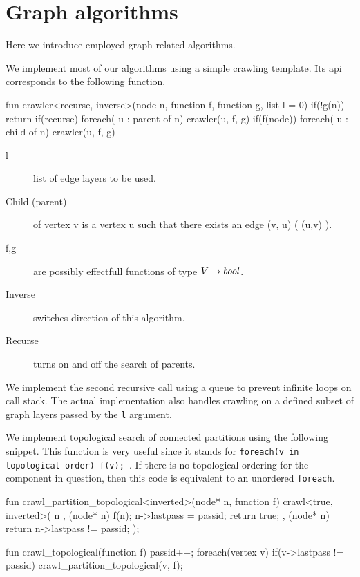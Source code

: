 \section{Graph algorithms}

Here we introduce employed graph-related algorithms. 

We implement most of our algorithms using a simple crawling template. Its api corresponds to the following function.

\begin{code}
fun crawler<recurse, inverse>(node n, function f, function g, list l = {0})
{
  if(!g(n))
    return
  if(recurse)
    foreach( u : parent of n)
      crawler(u, f, g)
  if(f(node))
    foreach( u : child of n)
      crawler(u, f, g)
}
\end{code}

\begin{description}
  \item [l] list of edge layers to be used.
  \item [Child (parent)] of vertex v is a vertex u such that there exists an edge (v, u) ( (u,v) ).
  \item [f,g] are possibly effectfull functions of type $V \rightarrow bool$.
  \item [Inverse] switches direction of this algorithm.
  \item [Recurse] turns on and off the search of parents.
\end{description}

We implement the second recursive call using a queue to prevent infinite loops on call stack. The actual implementation also handles crawling on a defined subset of graph layers passed by the \texttt{l} argument.

We implement topological search of connected partitions using the following snippet. This function is very useful since it stands for \texttt{foreach(v in topological order) f(v); }. If there is no topological ordering for the component in question, then this code is equivalent to an unordered \texttt{foreach}.

\begin{code}
fun crawl_partition_topological<inverted>(node* n, function f)
{
  crawl<true, inverted>( n
    , (node* n){ f(n); n->lastpass = passid; return true;}
    , (node* n){ return n->lastpass != passid;}
  );
}
\end{code}
\begin{code}
fun crawl_topological(function f)
{
  passid++;
  foreach(vertex v)
    if(v->lastpass != passid)
      crawl_partition_topological(v, f);
}
\end{code}

